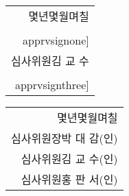 \documentclass[a4paper]{article}
\makeatletter
\newenvironment{myepigraph}
{\par\hfill
	\begin{tabular}{@{}r@{\hspace{20mm}}}%
	}%
	{%
	\end{tabular}\par\medskip}
\def\apprvsignone{parkdaegam.png}	%
\def\apprvsigntwo{ntieaK.png}		%
\def\apprvsignthree{hongpanseo.png}	%
\def\apprvsign{(인)}
\newlength{\apprvsignonewidth}
\newlength{\apprvsigntwowidth}
\newlength{\apprvsignthreewidth}
\newlength{\apprvsignoneheight}
\newlength{\apprvsigntwoheight}
\newlength{\apprvsignthreeheight}
\newlength{\apprvsignwidth}
\makeatother
\begin{document}
	
	\vspace*{3em}
	
	\begin{myepigraph}
		{\Large {몇년몇월며칠}}\\[11mm]
		{\Large 
		심사위원장\hspace{5mm}박 대 감\hspace{6mm}%
		\trimbox{%
			{4.4mm} {\apprvsignoneheight/2} %
			{\apprvsignonewidth-\apprvsignwidth-1mm-2.67mm} %
			{\apprvsignoneheight/2}}
		{%
			\begin{tikzpicture}
			\draw (\apprvsignonewidth/2-\apprvsignwidth-1mm,0) 
			node {%
				\texttt{[image: \\apprvsignone]}};
				\draw (0,0) node {\apprvsign};
			\end{tikzpicture}}%
		}\\[8mm]
		{\Large 
		심사위원\hspace{5mm}김 교 수\hspace{6mm}%
		\trimbox{%
			{4.4mm} {\apprvsigntwoheight/2} %
			{\apprvsigntwowidth-\apprvsignwidth-1mm-2.67mm} %
			{\apprvsigntwoheight/2}}
		{%
			\begin{tikzpicture}
			\draw (\apprvsigntwowidth/2-\apprvsignwidth-1mm,0) 
			node {%
				\includegraphics[height=\apprvsigntwoheight]%
				{\apprvsigntwo}%
			};
				\draw (0,0) node {\apprvsign};
			\end{tikzpicture}}%
		}\\[8mm]
		{\Large 
		심사위원\hspace{5mm}홍 판 서\hspace{6mm}%
		\trimbox{%
			{4.4mm} {\apprvsignthreeheight/2} %
			{\apprvsignthreewidth-\apprvsignwidth-1mm-2.67mm} %
			{\apprvsignthreeheight/2}}
		{%
			\begin{tikzpicture}
			\draw (\apprvsignthreewidth/2-\apprvsignwidth-1mm,0) 
			node {%
				\texttt{[image: \\apprvsignthree]}};
				\draw (0,0) node {\apprvsign};
			\end{tikzpicture}}%
		}
	\end{myepigraph}


	\vspace{3em}

	\begin{myepigraph}
	{\Large {몇년몇월며칠}}\\[11mm]
	{\Large 심사위원장\hspace{5mm}박 대 감\hspace{6mm}(인)}\\[8mm]
	{\Large 심사위원\hspace{5mm}김 교 수\hspace{6mm}(인)}\\[8mm]
	{\Large 심사위원\hspace{5mm}홍 판 서\hspace{6mm}(인)}
	\end{myepigraph}
\end{document}
